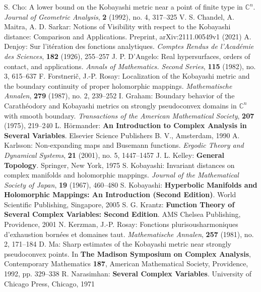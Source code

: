 \begin{thebibliography}{widest entry}
   S. Cho: A lower bound on the Kobayashi metric near a point of finite type in $\mathbb{C}^n$. \textit{Journal of Geometric Analysis}, \textbf{2} (1992), no. 4, 317--325
   V. S. Chandel, A. Maitra, A. D. Sarkar: Notions of Visibility with respect to the Kobayashi distance: Comparison and Applications. Preprint, arXiv:2111.00549v1 (2021)
   A. Denjoy: Sur l'itération des fonctions analytiques. \textit{Comptes Rendus de l'Académie des Sciences}, \textbf{182} (1926), 255--257
   J. P. D'Angelo: Real hypersurfaces, orders of contact, and applications. \textit{Annals of Mathematics. Second Series}, \textbf{115} (1982), no. 3, 615--637
   F. Forstnerič, J.-P. Rosay: Localization of the Kobayashi metric and the boundary continuity of proper holomorphic mappings. \textit{Mathematische Annalen}, \textbf{279} (1987), no. 2, 239--252
   I. Graham: Boundary behavior of the Carathéodory and Kobayashi metrics on strongly pseudoconvex domains in $\mathbb{C}^n$ with smooth boundary. \textit{Transactions of the American Mathematical Society}, \textbf{207} (1975), 219--240
   L. Hörmander: \textbf{An Introduction to Complex Analysis in Several Variables}. Elsevier Science Publishers B. V., Amsterdam, 1990
   A. Karlsson: Non-expanding maps and Busemann functions. \textit{Ergodic Theory and Dynamical Systems}, \textbf{21} (2001), no. 5, 1447--1457
   J. L. Kelley: \textbf{General Topology}. Springer, New York, 1975
   S. Kobayashi: Invariant distances on complex manifolds and holomorphic mappings. \textit{Journal of the Mathematical Society of Japan}, \textbf{19} (1967), 460--480
   S. Kobayashi: \textbf{Hyperbolic Manifolds and Holomorphic Mappings: An Introduction (Second Edition)}. World Scientific Publishing, Singapore, 2005
   S. G. Krantz: \textbf{Function Theory of Several Complex Variables: Second Edition}. AMS Chelsea Publishing, Providence, 2001
   N. Kerzman, J.-P. Rosay: Fonctions plurisousharmoniques d'exhaustion bornées et domaines taut. \textit{Mathematische Annalen}, \textbf{257} (1981), no. 2, 171--184
   D. Ma: Sharp estimates of the Kobayashi metric near strongly pseudoconvex points. In \textbf{The Madison Symposium on Complex Analysis}, Contemporary Mathematics \textbf{187}, American Mathematical Society, Providence, 1992, pp. 329--338
   R. Narasimhan: \textbf{Several Complex Variables}. University of Chicago Press, Chicago, 1971

\end{thebibliography}
